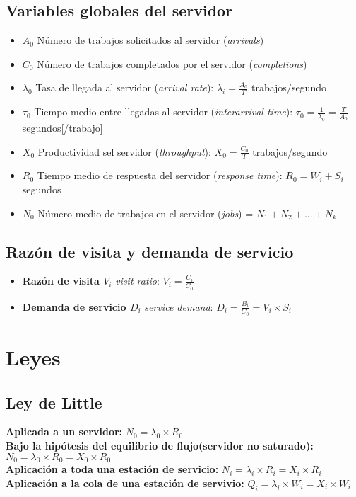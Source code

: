 \subsection{Variables globales del servidor}
\begin{itemize}
	\item \textbf{$A_0$} Número de trabajos solicitados al servidor (\textit{arrivals})
	\item \textbf{$C_0$} Número de trabajos completados por el servidor (\textit{completions})
	\item \textbf{$\lambda_0$} Tasa de llegada al servidor (\textit{arrival rate}): $\lambda_i = \frac{A_0}{T} $ trabajos/segundo
	\item \textbf{$\tau_0$} Tiempo medio entre llegadas al servidor (\textit{interarrival time}): $\tau_0= \frac{1}{\lambda_0}=\frac{T}{A_0}$ segundos[/trabajo]
	\item \textbf{$X_0$} Productividad sel servidor (\textit{throughput}): $X_0=\frac{C_0}{T}$ trabajos/segundo
	\item \textbf{$R_0$} Tiempo medio de respuesta del servidor (\textit{response time}): $R_0= W_i + S_i$ segundos
	\item \textbf{$N_0$} Número medio de trabajos en el servidor (\textit{jobs}) = $N_1+N_2+...+N_k$
\end{itemize}
\subsection{Razón de visita y demanda de servicio}
\begin{itemize}
	\item \textbf{Razón de visita $V_i$} \textit{visit ratio}: $V_i= \frac{C_i}{C_0}$
	\item \textbf{Demanda de servicio $D_i$} \textit{service demand}: $D_i= \frac{B_i}{C_0}= V_i \times S_i$
\end{itemize}

\section{Leyes}
\subsection{Ley de Little}
\textbf{Aplicada a un servidor: } $N_0=\lambda_0 \times R_0$\\
\textbf{Bajo la hipótesis del equilibrio de flujo(servidor no saturado): }\\ $N_0=\lambda_0 \times R_0 = X_0 \times R_0$\\
\textbf{Aplicación a toda una estación de servicio: } $N_i=\lambda_i \times R_i = X_i \times R_i$\\
\textbf{Aplicación a la cola de una estación de servivio: } $Q_i=\lambda_i \times W_i = X_i \times W_i$\\
